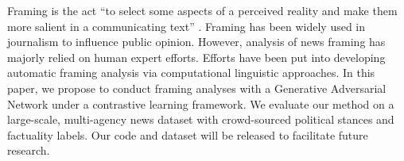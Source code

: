Framing is the act “to select some aspects of a perceived reality and make them more salient in a communicating text” \cite{entman1993}. Framing has been widely used in journalism to influence public opinion. However, analysis of news framing has majorly relied on human expert efforts. Efforts have been put into developing automatic framing analysis via computational linguistic approaches. In this paper, we propose to conduct framing analyses with a Generative Adversarial Network under a contrastive learning framework. We evaluate our method on a large-scale, multi-agency news dataset with crowd-sourced political stances and factuality labels. Our code and dataset will be released to facilitate future research.